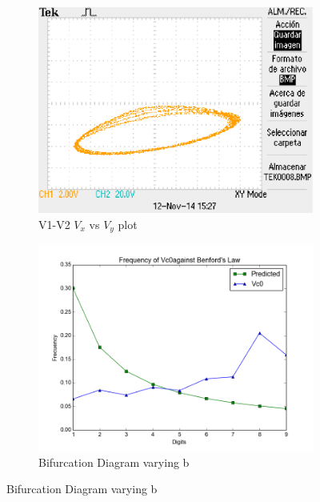 \begin{itemize}
\begin{figure}[H]
    \centering
    \begin{subfigure}[b]{0.4\textwidth}
        \includegraphics[width=\textwidth]{imagenes/2-benford/chua_2000.eps}
        \caption{V1-V2 $V_x$ vs $V_y$ plot}
    \end{subfigure}
    \begin{subfigure}[b]{0.8\textwidth}
        \includegraphics[width=\textwidth]{imagenes/2-benford/benford_chua20.png}
        \caption{Bifurcation Diagram varying b}
    \end{subfigure}
\end{figure}

\end{itemize}
